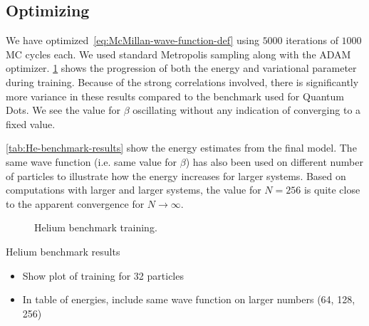 \documentclass[Thesis.tex]{subfiles}
\begin{document}
\subsection{Optimizing}

We have optimized~\cref{eq:McMillan-wave-function-def} using $\num{5000}$
iterations of $\num{1000}$ MC cycles each. We used standard Metropolis sampling
along with the ADAM optimizer. \cref{fig:He-benchmark-training} shows the
progression of both the energy and variational parameter during training.
Because of the strong correlations involved, there is significantly more
variance in these results compared to the benchmark used for Quantum Dots. We
see the value for $\beta$ oscillating without any indication of converging to a
fixed value.

\cref{tab:He-benchmark-results} show the energy estimates from the final model.
The same wave function (i.e. same value for $\beta$) has also been used on
different number of particles to illustrate how the energy increases for larger
systems. Based on computations with larger and larger systems, the value for $N
= 256$ is quite close to the apparent convergence for $N\to\infty$.

\begin{figure}[h]
  \centering
  
  \caption{Helium benchmark training.}
  \label{fig:He-benchmark-training}
\end{figure}

\begin{table}[h]
  \centering
  
  \caption{Helium benchmark results}
  \label{tab:He-benchmark-results}
\end{table}


\begin{itemize}
\item Show plot of training for 32 particles
\item In table of energies, include same wave function on larger numbers (64,
  128, 256)
\end{itemize}
\end{document}
